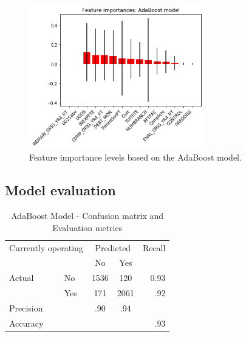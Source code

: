 \documentclass[11pt, letterpaper]{article}
\begin{document}
\begin{figure}[h]
\begin{center}
\includegraphics[width=3in]{ABFeatureImportance.png}

\caption{Feature importance levels based on the AdaBoost model.} 
\label{fig:Features}
\end{center}
\end{figure}

\subsection{Model evaluation}

\begin{table}[h]
\begin{center}
	\caption{AdaBoost Model - Confusion matrix and Evaluation metrics}
		\begin{tabular}{l l | c c r }
\multicolumn{2}{l}{Currently operating} & \multicolumn{2}{c}{Predicted} & Recall \\
& & No & Yes &  \\ 
\cline{2-5}
Actual & No & 1536 &  120 & 0.93 \\
& Yes & 171 & 2061 & .92 \\  \hline
Precision&  & .90 & .94 \\ 
Accuracy & & &  & .93 \\
	\end{tabular}
	\label{tab:ABConfusion}
	\end{center}
	\end{table}
\end{document}
